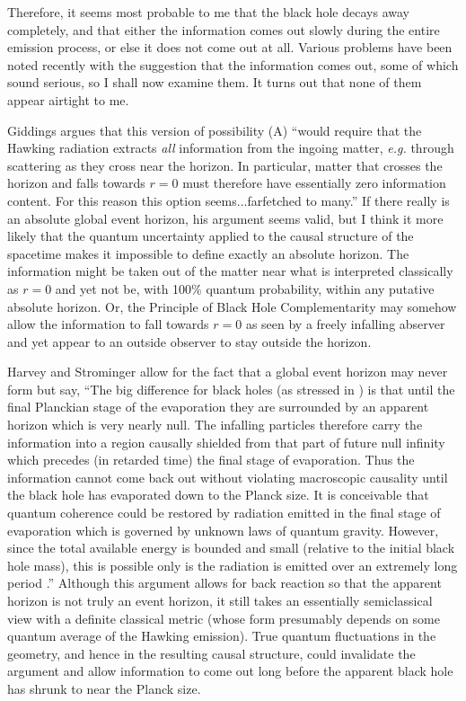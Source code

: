      Therefore, it seems most probable to me that the black hole
decays away
completely, and that either the information comes out slowly during
the entire
emission process, or else it does not come out at all.  Various
problems have
been noted recently with the suggestion that the information comes
out, some of
which sound serious, so I shall now examine them.  It turns out that
none of
them appear airtight to me.

     Giddings \cite{Gid93} argues that this version of possibility
(A) ``would
require that the Hawking radiation extracts {\it all} information
from the
ingoing matter, {\it e.g.} through scattering as they cross near the
horizon.
In particular, matter that crosses the horizon and falls towards $r =
0$ must
therefore have essentially zero information content.  For this reason
this
option seems...farfetched to many.''  If there really is an absolute
global
event horizon, his argument seems valid, but I think it more likely
that the
quantum uncertainty applied to the causal structure of the spacetime
makes it
impossible to define exactly an absolute horizon.  The information
might be
taken out of the matter near what is interpreted classically as $r =
0$ and yet
not be, with 100\% quantum probability, within any putative absolute
horizon.
Or, the Principle of Black Hole Complementarity \cite{STU,Sus,SusT}
may somehow allow the information to fall towards $r = 0$ as seen by
a freely infalling abserver and yet appear to an outside observer to
stay
outside the horizon.

     Harvey and Strominger \cite{HS} allow for the fact that a global
event
horizon may never form but say, ``The big difference for black holes
(as
stressed in \cite{Wal84}) is that until the final Planckian stage of
the
evaporation they are surrounded by an apparent horizon which is very
nearly
null.  The infalling particles therefore carry the information into a
region
causally shielded from that part of future null infinity which
precedes (in
retarded time) the final stage of evaporation.  Thus the information
cannot
come back out without violating macroscopic causality until the black
hole has
evaporated down to the Planck size.  It is conceivable that quantum
coherence
could be restored by radiation emitted in the final stage of
evaporation which
is governed by unknown laws of quantum gravity.  However, since the
total
available energy is bounded and small (relative to the initial black
hole
mass), this is possible only is the radiation is emitted over an
extremely long
period \cite{ACN}.''  Although this argument allows for back reaction
so that
the apparent horizon is not truly an event horizon, it still takes an
essentially semiclassical view with a definite classical metric
(whose form
presumably depends on some quantum average of the Hawking emission).
True
quantum fluctuations in the geometry, and hence in the resulting
causal
structure, could invalidate the argument and allow information to
come out long
before the apparent black hole has shrunk to near the Planck size.

